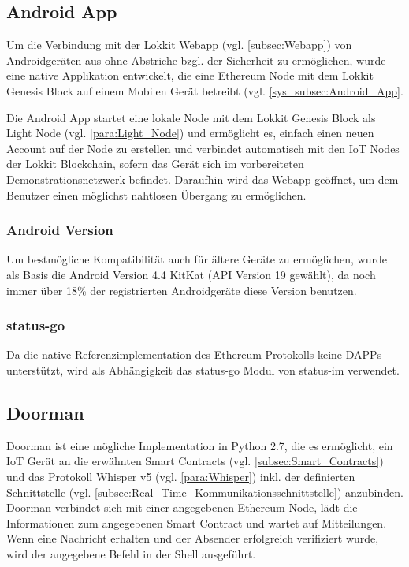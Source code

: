 \subsection{Android App}
\label{subsec:Android_App}
Um die Verbindung mit der Lokkit Webapp (vgl. \ref{subsec:Webapp}) von Androidgeräten aus ohne Abstriche bzgl. der Sicherheit zu ermöglichen, wurde eine native Applikation entwickelt, die eine Ethereum Node mit dem Lokkit Genesis Block auf einem Mobilen Gerät betreibt (vgl. \ref{sys_subsec:Android_App}.

Die Android App startet eine lokale Node mit dem Lokkit Genesis Block als Light Node (vgl. \ref{para:Light_Node}) und ermöglicht es, einfach einen neuen Account auf der Node zu erstellen und verbindet automatisch mit den IoT Nodes der Lokkit Blockchain, sofern das Gerät sich im vorbereiteten Demonstrationsnetzwerk befindet. Daraufhin wird das Webapp geöffnet, um dem Benutzer einen möglichst nahtlosen Übergang zu ermöglichen.
\subsubsection{Android Version}
Um bestmögliche Kompatibilität auch für ältere Geräte zu ermöglichen, wurde als Basis die Android Version 4.4 KitKat (API Version 19 gewählt), da noch immer über 18\% der registrierten Androidgeräte diese Version benutzen.\cite[Android/Dashboards]{developer.android.com}
\subsubsection{status-go}
Da die native Referenzimplementation des Ethereum Protokolls keine \acrshort{DAPPs} unterstützt, wird als Abhängigkeit das status-go Modul von status-im verwendet.\cite{go-ethereum,status.im,github.com/status-im/status-go}


\subsection{Doorman}
\label{subsec:Doorman}
Doorman ist eine mögliche Implementation in Python 2.7, die es ermöglicht, ein IoT Gerät an die erwähnten Smart Contracts (vgl. \ref{subsec:Smart_Contracts}) und das Protokoll Whisper v5 (vgl. \ref{para:Whisper}) inkl. der definierten Schnittstelle (vgl. \ref{subsec:Real_Time_Kommunikationsschnittstelle}) anzubinden. Doorman verbindet sich mit einer angegebenen Ethereum Node, lädt die Informationen zum angegebenen Smart Contract und wartet auf Mitteilungen. Wenn eine Nachricht erhalten und der Absender erfolgreich verifiziert wurde, wird der angegebene Befehl in der Shell ausgeführt.

